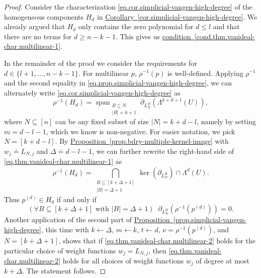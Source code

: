 \documentclass[11pt]{article}
\numberwithin{equation}{section}
\theoremstyle{definition}
\theoremstyle{plain}
\newcommand{\expref}[2]{\hyperref[#2]{#1~\ref{#2}}}
\newcommand{\linspan}{\ensuremath{\mathop{\mathrm{span}}}}
\newcommand{\bdry}{\partial}
\newcommand{\exterior}{\ensuremath{\Lambda}}
\newcommand{\SimplicesBase}{\exterior}
\newcommand{\Simplicesparam}[1]{\SimplicesBase^{#1}(\SpanVertices)}
\newcommand{\SpanVertices}{\ensuremath{U}}
\newcommand{\Srepr}{\rho}
\begin{document}
\begin{proof}
Consider the characterization \eqref{eq.cor.simplicial-vangen-high-degree} of the homogeneous components $H_d$ in \expref{Corollary}{cor.simplicial-vangen-high-degree}. We already argued that $H_d$ only contains the zero polynomial for $d \le l$ and that there are no terms for $d \ge n-k-1$. This gives us \expref{condition}{cond.thm.vanideal-char.multilinear-1}.

In the remainder of the proof we consider the requirements for $d \in \{l+1, \dots, n-k-1\}$. For multilinear $p$, $\Srepr^{-1}(p)$ is well-defined. Applying $\Srepr^{-1}$ and the second equality in \eqref{eq.prop.simplicial-vangen-high-degree}, we can alternately write \eqref{eq.cor.simplicial-vangen-high-degree} as
\begin{equation}\label{eq.thm.vanideal-char.multilinear-1}
\Srepr^{-1}(H_d) = \linspan_{\substack{B \subseteq N \\ |B|=k+1}} \bdry_{L_N^B}(\Simplicesparam{k+d+1}),
\end{equation}
where $N \subseteq [n]$ can be any fixed subset of size $|N|=k+d-l$, namely by setting $m=d-l-1$, which we know is non-negative. For easier notation, we pick $N = [k+d-l]$. By \expref{Proposition}{prop.bdry-multiple-kernel-image} with $w_j \doteq L_{N,j}$ and $\Delta \doteq d-l-1$, we can further rewrite the right-hand side of \eqref{eq.thm.vanideal-char.multilinear-1} as
\[
\Srepr^{-1}(H_d) = \bigcap_{\substack{B \subseteq [k+\Delta+1] \\ |B|=\Delta+1}} \ker(\bdry_{L_N^B}) \cap \Simplicesparam{d}.
\]
Thus $p^{(d)} \in H_d$ if and only if 
\begin{equation}\label{eq.thm.vanideal-char.multilinear-2}
(\forall B \subseteq [k+\Delta+1] \textrm{ with }|B|=\Delta+1) \; \;  
\bdry_{L_N^B}(\Srepr^{-1}(p^{(d)}))=0.
\end{equation}
Another application of the second part of \expref{Proposition}{prop.simplicial-vangen-high-degree}, this time with $k \gets \Delta$, $m \gets k$, $t \gets d$, $\nu=\Srepr^{-1}(p^{(d)})$, and $N=[k+\Delta+1]$, shows that if \eqref{eq.thm.vanideal-char.multilinear-2} holds for the particular choice of weight functions $w_j = L_{N,j}$, then \eqref{eq.thm.vanideal-char.multilinear-2} holds for all choices of weight functions $w_j$ of degree at most $k+\Delta$. The statement follows.
\end{proof}
\end{document}
